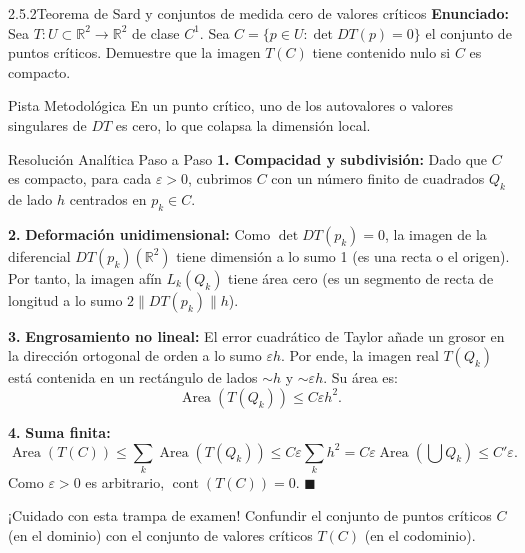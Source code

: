 \documentclass[11pt,a4paper]{article}
\begin{document}
\begin{nivelbox}{2.5.2}{Teorema de Sard y conjuntos de medida cero de valores críticos}
\textbf{Enunciado:}\\
Sea $T: U \subset \mathbb{R}^2 \to \mathbb{R}^2$ de clase $C^1$. Sea $C = \{ p \in U : \det DT(p) = 0 \}$ el conjunto de puntos críticos. Demuestre que la imagen $T(C)$ tiene contenido nulo si $C$ es compacto.

\begin{observacionbox}{Pista Metodológica}
En un punto crítico, uno de los autovalores o valores singulares de $DT$ es cero, lo que colapsa la dimensión local.
\end{observacionbox}

\begin{ejerciciobox}{Resolución Analítica Paso a Paso}
\smallskip\noindent\textbf{1.} \textbf{Compacidad y subdivisión:}
Dado que $C$ es compacto, para cada $\varepsilon > 0$, cubrimos $C$ con un número finito de cuadrados $Q_k$ de lado $h$ centrados en $p_k \in C$.

\smallskip\noindent\textbf{2.} \textbf{Deformación unidimensional:}
Como $\det DT(p_k) = 0$, la imagen de la diferencial $DT(p_k)(\mathbb{R}^2)$ tiene dimensión a lo sumo 1 (es una recta o el origen).
Por tanto, la imagen afín $L_k(Q_k)$ tiene área cero (es un segmento de recta de longitud a lo sumo $2\|DT(p_k)\| h$).

\smallskip\noindent\textbf{3.} \textbf{Engrosamiento no lineal:}
El error cuadrático de Taylor añade un grosor en la dirección ortogonal de orden a lo sumo $\varepsilon h$. Por ende, la imagen real $T(Q_k)$ está contenida en un rectángulo de lados $\sim h$ y $\sim \varepsilon h$.
Su área es:
\[\operatorname{Area}(T(Q_k)) \le C \varepsilon h^2.\]

\smallskip\noindent\textbf{4.} \textbf{Suma finita:}
\[\operatorname{Area}(T(C)) \le \sum_k \operatorname{Area}(T(Q_k)) \le C \varepsilon \sum_k h^2 = C \varepsilon \operatorname{Area}\left(\bigcup Q_k\right) \le C' \varepsilon.\]
Como $\varepsilon > 0$ es arbitrario, $\operatorname{cont}(T(C)) = 0$. $\blacksquare$
\end{ejerciciobox}

\begin{errorbox}{¡Cuidado con esta trampa de examen!}
Confundir el conjunto de puntos críticos $C$ (en el dominio) con el conjunto de valores críticos $T(C)$ (en el codominio).
\end{errorbox}
\end{nivelbox}
\bigskip
\end{document}
